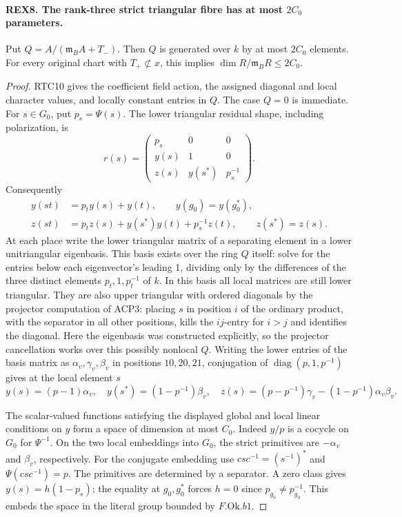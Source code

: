 \paragraph{REX8. The rank-three strict triangular fibre has at most \(2C_0\) parameters.}
\label{claim:REX8}
Put \(Q=A/(\mathfrak m_B A+T_-)\). Then \(Q\) is generated over
\(k\) by at most \(2C_0\) elements. For every original chart with
\(T_+\not\subset x\), this implies \(\dim R/\mathfrak m_B R\le2C_0\).
\begin{proof}
RTC10 gives the coefficient field action, the assigned diagonal and
local character values, and locally constant entries in \(Q\).
The case \(Q=0\) is immediate. For \(s\in G_0\), put \(p_s=\Psi(s)\).
The lower triangular residual shape, including polarization, is
\[
 r(s)=\begin{pmatrix}p_s&0&0\\ y(s)&1&0\\ z(s)&y(s^*)&p_s^{-1}\end{pmatrix}.
\]
Consequently
\[
 \begin{split}
 y(st)&=p_t y(s)+y(t),\qquad y(g_0)=y(g_0^*),\\
 z(st)&=p_t z(s)+y(s^*)y(t)+p_s^{-1}z(t),\qquad z(s^*)=z(s).
 \end{split}
\]
At each place write the lower triangular matrix of a separating element
in a lower unitriangular eigenbasis. This basis exists over the ring
\(Q\) itself: solve for the entries below each eigenvector's leading
1, dividing only by the differences of the three distinct elements
\(p_t,1,p_t^{-1}\) of \(k\). In this basis all local matrices are
still lower triangular. They are also upper triangular with ordered
diagonals by the projector computation of ACP3: placing \(s\) in
position \(i\) of the ordinary product, with the separator in all
other positions, kills the \(ij\)-entry for \(i>j\) and identifies
the diagonal. Here the eigenbasis was constructed explicitly, so the
projector cancellation works over this possibly nonlocal \(Q\).
Writing the lower entries of the basis matrix as
\(\alpha_v,\gamma_v,\beta_v\) in positions \(10,20,21\), conjugation
of \(\operatorname{diag}(p,1,p^{-1})\) gives at the local element \(s\)
\[
 y(s)=(p-1)\alpha_v,\quad y(s^*)=(1-p^{-1})\beta_v,\quad
 z(s)=(p-p^{-1})\gamma_v-(1-p^{-1})\alpha_v\beta_v.
\]

The scalar-valued functions satisfying the displayed global and local
linear conditions on \(y\) form a space of dimension at most \(C_0\).
Indeed \(y/p\) is a cocycle on \(G_0\) for \(\Psi^{-1}\).
On the two local embeddings into \(G_0\), the strict primitives are
\(-\alpha_v\) and \(\beta_v\), respectively. For the conjugate embedding
use \(csc^{-1}=(s^{-1})^*\) and \(\Psi(csc^{-1})=p\).
The primitives are determined by a separator. A zero class gives
\(y(s)=h(1-p_s)\); the equality at \(g_0,g_0^*\) forces \(h=0\)
since \(p_{g_0}\ne p_{g_0}^{-1}\). This embeds the space in the
literal group bounded by \(F.\mathrm{Ok}.b1\).


\end{proof}
